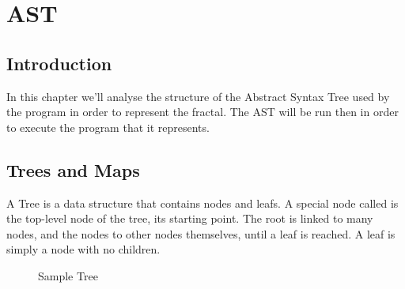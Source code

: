 \chapter{AST}

\section{Introduction}

In this chapter we'll analyse the structure of the Abstract Syntax Tree used by the program in order to represent the fractal. The AST will be run then in order to execute the program that it represents.

\section{Trees and Maps}

A Tree is a data structure that contains nodes and leafs. A special node called  is the top-level node of the tree, its starting point. The root is linked to many nodes, and the nodes to other nodes themselves, until a leaf is reached. A leaf is simply a node with no children.

\begin{figure}
\centering

\label{fig:treesample}
\caption{Sample Tree}
\end{figure}






